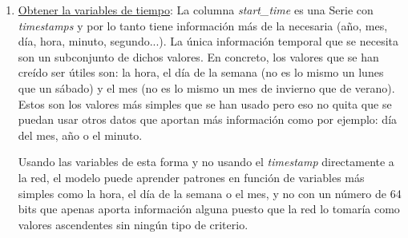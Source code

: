 \begin{enumerate}
\begin{table}[H]
\begin{tabular}{c|rrr}
        \bottomrule
    \end{tabular}
    \cprotect\caption{Ejemplo de \textit{dataset} que contiene los intervalos.}
    \label{tab:intervals_example}
    \end{table}
    
    Principalemente, el código usado para este paso hace uso de la función de \textit{pandas} denominada \small{\verb|pivot()|}:
    \begin{verbatim}
# Prepare the new columns names for each station
df["quantity_index"] = "quantity_" + \
                        df["from_station_id"].astype("str")

# We don't need from_station_id anymore
df = df.drop(columns=["from_station_id"])

# Make the pivot around quantity_index column and
# set the value of the column the same value as
# quantity from before saving quantity from
df = df.pivot(columns='quantity_index', values='quantity')

# If station any interval didn't have any trips for
# a station, then fill it with 0
return df.fillna(0)
    \end{verbatim}
    
    Si se compara la tabla \ref{tab:starttime_withsid} con la tabla \ref{tab:intervals_example} se puede ver que la cantidad de datos ha sido reducida considerablemente y se ha seleccionado solo la información necesaria que la red necesitará.
    \newline
    
    \item \underline{Obtener la variables de tiempo}: La columna \textit{start\_time} es una Serie con \textit{timestamps} y por lo tanto tiene información más de la necesaria (año, mes, día, hora, minuto, segundo...). La única información temporal que se necesita son un subconjunto de dichos valores. En concreto, los valores que se han creído ser útiles son: la hora, el día de la semana (no es lo mismo un lunes que un sábado) y el mes (no es lo mismo un mes de invierno que de verano). Estos son los valores más simples que se han usado pero eso no quita que se puedan usar otros datos que aportan más información como por ejemplo: día del mes, año o el minuto. 
    \newline
    
    Usando las variables de esta forma y no usando el \textit{timestamp} directamente a la red, el modelo puede aprender patrones en función de variables más simples como la hora, el día de la semana o el mes, y no con un número de 64 bits que apenas aporta información alguna puesto que la red lo tomaría como valores ascendentes sin ningún tipo de criterio.
    

\end{enumerate}
